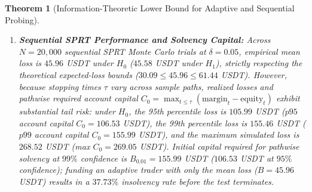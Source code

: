 \documentclass[12pt]{article}
\newtheorem{theorem}{Theorem}[section]
\theoremstyle{definition}
\theoremstyle{remark}
\begin{document}
\begin{theorem}[Information-Theoretic Lower Bound for Adaptive and Sequential Probing]
\begin{enumerate}
\begin{enumerate}[label=(\alph*)]
\begin{equation}
\frac{\inf_{\pi \in \Pi_{\mathrm{adapt}}} \mathbb{E}_0[L_0(v^\pi)]}{\inf_{v \in \mathcal{V}_{\mathrm{det}}} L_0(v)} = \frac{\inf_{\pi \in \Pi_{\mathrm{adapt}}} \mathbb{E}_0[L_0(v^\pi)]}{C^*_{\mathrm{det,quad}}(\delta)} \ge \frac{\operatorname{kl}(\alpha, 1-\beta)}{2 z_{1-\alpha}^2} = \frac{\operatorname{kl}(0.05, 0.95)}{2 \times (1.6449)^2} \approx 0.4897,
\label{eq:ia_adaptive_inequality}
\end{equation}
establishing that dynamic adaptation can reduce expected fee-free quadratic loss by at most $1 - 0.4897 = 51.03\%$ in the infinite-horizon limit ($29.94 / 61.19 = 0.4893$, or at most $51.07\%$ against the finite-horizon eigenvector at $L=480$), and cannot alter the fundamental $\Theta(\delta^{-4})$ scaling.
\item \emph{Fee-and-Margin Constrained Account Problem:} When $L_1$ taker fees and maintenance margin are included, the exact deterministic minimum $C^*_{\mathrm{acc}}(\delta) \in [61.44, 64.56]$~USDT is bracketed rather than known in closed form; pairing the adaptive lower bound $\underline{C}_{\mathrm{adapt}}(0.05) = 30.09$~USDT with the certified feasible deterministic upper bound $\overline{C}_0^{\mathrm{feas}}(\le 240) = 64.56$~USDT ($64.50$~USDT terminal loss plus fee) yields a certified ratio $\ge 30.09 / 64.56 \approx 0.4661$ (at most $53.39\%$ reduction). Inequality~\eqref{eq:ia_adaptive_inequality} bounds expected loss under the martingale stopping model; it does not guarantee a saving in initial pathwise solvency capital.
\end{enumerate}
\item \textbf{Sequential SPRT Performance and Solvency Capital:} Across $N=20{,}000$ sequential SPRT Monte Carlo trials at $\delta = 0.05$, empirical mean loss is $45.96$ USDT under $H_0$ ($45.58$ USDT under $H_1$), strictly respecting the theoretical expected-loss bounds ($30.09 \le 45.96 \le 61.44$ USDT). However, because stopping times $\tau$ vary across sample paths, realized losses and pathwise required account capital $C_0 = \max_{t \le \tau}(\text{margin}_t - \text{equity}_t)$ exhibit substantial tail risk: under $H_0$, the 95th percentile loss is $105.99$ USDT ($p95$ account capital $C_0 = 106.53$ USDT), the 99th percentile loss is $155.46$ USDT ($p99$ account capital $C_0 = 155.99$ USDT), and the maximum simulated loss is $268.52$ USDT (max $C_0 = 269.05$ USDT). Initial capital required for pathwise solvency at $99\%$ confidence is $B_{0.01} = 155.99$ USDT ($106.53$ USDT at $95\%$ confidence); funding an adaptive trader with only the mean loss ($B = 45.96$ USDT) results in a $37.73\%$ insolvency rate before the test terminates.
\end{enumerate}
\end{theorem}
\end{document}
